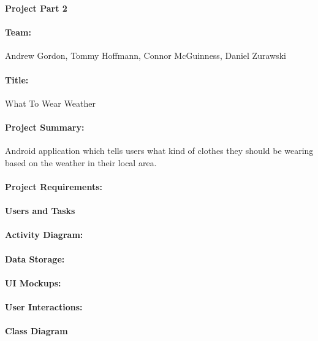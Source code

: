 \documentclass[12pt,a4paper]{article}
\begin{document}

\noindent\textbf{Project Part 2}

\paragraph{Team:}Andrew Gordon, Tommy Hoffmann, Connor McGuinness, Daniel Zurawski

\paragraph{Title:}What To Wear Weather

\paragraph{Project Summary:}Android application which tells users what kind
of clothes they should be wearing based on the weather in their local area.

\paragraph{Project Requirements:}

\paragraph{Users and Tasks}

\paragraph{Activity Diagram:}

\paragraph{Data Storage:}

\paragraph{UI Mockups:}

\paragraph{User Interactions:}

\paragraph{Class Diagram}
\end{document}

